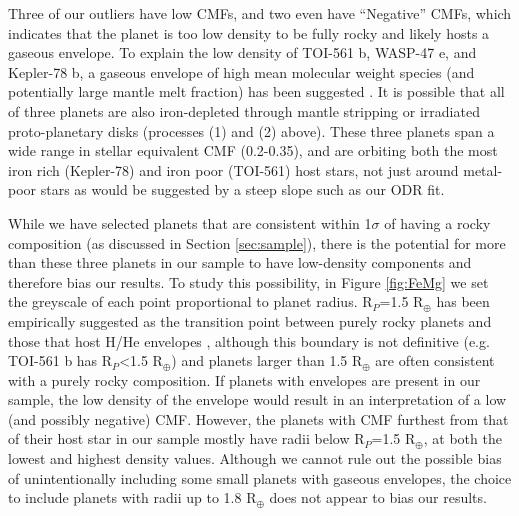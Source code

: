 \documentclass[twocolumn]{aastex631}
\begin{document}

Three of our outliers have low CMFs, and two even have ``Negative'' CMFs, which indicates that the planet is too low density to be fully rocky and likely hosts a gaseous envelope. To explain the low density of TOI-561 b, WASP-47 e, and Kepler-78 b, a gaseous envelope of high mean molecular weight species (and potentially large mantle melt fraction) has been suggested \citep{Brinkman2023B, 2022MNRAS.511.4551L, 2023arXiv230808687P, 2022AJ....163..197B}. It is possible that all of three planets are also iron-depleted through mantle stripping or irradiated proto-planetary disks (processes (1) and (2) above). These three planets span a wide range in stellar equivalent CMF (0.2-0.35), and are orbiting both the most iron rich (Kepler-78) and iron poor (TOI-561) host stars, not just around metal-poor stars as would be suggested by a steep slope such as our ODR fit. 


While we have selected planets that are consistent within 1$\sigma$ of having a rocky composition (as discussed in Section \ref{sec:sample}), there is the potential for more than these three planets in our sample to have low-density components and therefore bias our results. To study this possibility, in Figure \ref{fig:FeMg} we set the greyscale of each point proportional to planet radius. R$_{P}$=1.5 R$_{\oplus}$ has been empirically suggested as the transition point between purely rocky planets and those that host H/He envelopes \citep{2014ApJ...783L...6W, 2017AJ....154..109F}, although this boundary is not definitive (e.g. TOI-561 b has R$_{P}$<1.5 R$_{\oplus}$) and planets larger than 1.5 R$_{\oplus}$ are often consistent with a purely rocky composition. If planets with envelopes are present in our sample, the low density of the envelope would result in an interpretation of a low (and possibly negative) CMF. However, the planets with CMF furthest from that of their host star in our sample mostly have radii below R$_{P}$=1.5 R$_{\oplus}$, at both the lowest and highest density values. Although we cannot rule out the possible bias of unintentionally including some small planets with gaseous envelopes, the choice to include planets with radii up to 1.8 R$_{\oplus}$ does not appear to bias our results. 
\end{document}
